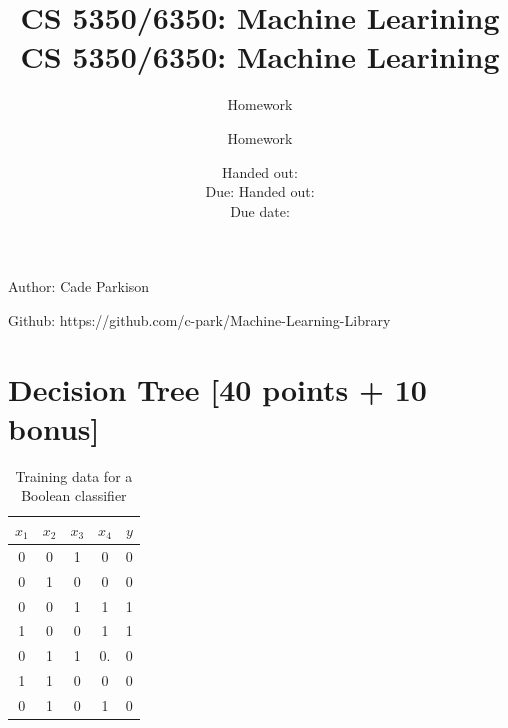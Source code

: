 \documentclass[12pt, fullpage,letterpaper]{article}
\title{CS 5350/6350: Machine Learining \semester}
\author{Homework \assignmentId}
\date{Handed out: \releaseDate\\
	Due: \dueDate}
\title{CS 5350/6350: Machine Learining \semester}
\author{Homework \assignmentId}
\date{Handed out: \releaseDate\\
  Due date: \dueDate}
\begin{document}
\maketitle


{\footnotesize
	Author: Cade Parkison
	
	Github: https://github.com/c-park/Machine-Learning-Library
	
}


\section{Decision Tree [40 points + 10 bonus]}

\begin{table}[h]
	\centering
	\begin{tabular}{cccc|c}
		$x_1$ & $x_2$ & $x_3$ & $x_4$ & $y$\\ 
		\hline\hline
		0 & 0 & 1 & 0 & 0 \\ \hline
		0 & 1 & 0 & 0 & 0 \\ \hline
		0 & 0 & 1 & 1 & 1 \\ \hline
		1 & 0 & 0 & 1 & 1 \\ \hline
		0 & 1 & 1 & 0.& 0\\ \hline
		1 & 1 & 0 & 0 & 0\\ \hline
		0 & 1 & 0 & 1 & 0\\ \hline
	\end{tabular}
	\caption{Training data for a Boolean classifier}
\end{table}
\end{document}
